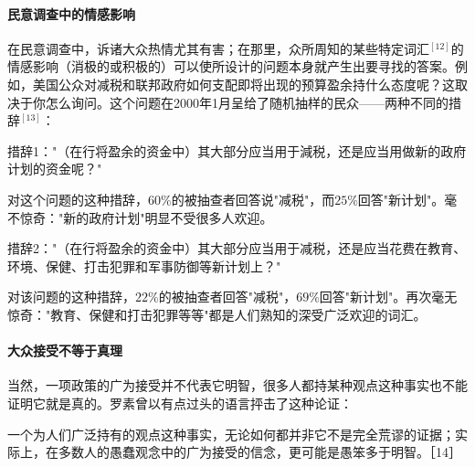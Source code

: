 \paragraph{民意调查中的情感影响}
在民意调查中，诉诸大众热情尤其有害；在那里，众所周知的某些特定词汇${ }^{[12]}$的情感影响（消极的或积极的）可以使所设计的问题本身就产生出要寻找的答案。例如，美国公众对减税和联邦政府如何支配即将出现的预算盈余持什么态度呢？这取决于你怎么询问。这个问题在2000年1月呈给了随机抽样的民众——两种不同的措辞${ }^{[13]}$：

措辞1："（在行将盈余的资金中）其大部分应当用于減税，还是应当用做新的政府计划的资金呢？"

对这个问题的这种措辞，60\%的被抽查者回答说"减税"，而$25\%$回答"新计划"。毫不惊奇："新的政府计划"明显不受很多人欢迎。

措辞2："（在行将盈余的资金中）其大部分应当用于减税，还是应当花费在教育、环境、保健、打击犯罪和军事防御等新计划上？"

对该问题的这种措辞，$22\%$的被抽查者回答"减税"，$69\%$回答"新计划"。再次毫无惊奇："教育、保健和打击犯罪等等"都是人们熟知的深受广泛欢迎的词汇。

\paragraph{大众接受不等于真理}
当然，一项政策的广为接受并不代表它明智，很多人都持某种观点这种事实也不能证明它就是真的。罗素曾以有点过头的语言抨击了这种论证：

一个为人们广泛持有的观点这种事实，无论如何都并非它不是完全荒谬的证据；实际上，在多数人的愚蠢观念中的广为接受的信念，更可能是愚笨多于明智。［14］ 